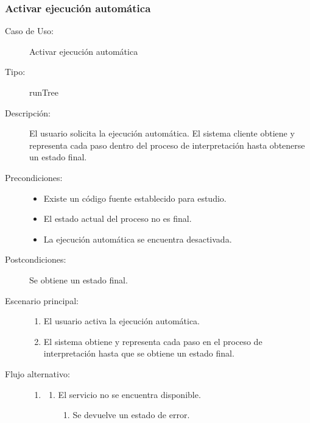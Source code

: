 \subsubsection{Activar ejecución automática} 

\begin{description}
   \item[Caso de Uso:] Activar ejecución automática
   \item [Tipo:] runTree
   \item[Descripción:] 
   El usuario solicita la ejecución automática. 
   El sistema cliente obtiene y representa cada paso dentro del proceso 
   de interpretación hasta obtenerse un estado final.
   \item[Precondiciones:] \hfill 
   \begin{itemize}
   \item Existe un código fuente establecido para estudio. 
   \item El estado actual del proceso no es final.
   \item La ejecución automática se encuentra desactivada. 
   \end{itemize}
   \item[Postcondiciones:] 
   Se obtiene un estado final.
   \item[Escenario principal:] \hfill
   \begin{enumerate}
   \item El usuario activa la ejecución automática.
   \item El sistema obtiene y representa cada paso en el proceso de interpretación hasta que se 
   obtiene un estado final.
   \end{enumerate}
   \item[Flujo alternativo:] \hfill 
   \begin{enumerate} \itemsep1pt \parskip0pt 
   \setcounter{enumi}{1}
   \renewcommand{\labelenumi}{}
   \renewcommand{\labelenumiii}{\arabic{enumiii}.}
   \renewcommand{\labelenumii}{\arabic{enumi}\alph{enumii}.}
      \item 
      \begin {enumerate}
         \setcounter{enumii}{0}
         \item El servicio no se encuentra disponible.
         \begin{enumerate}
         \item Se devuelve un estado de error.
         \end{enumerate}
      \end{enumerate}
   \end{enumerate}
\end{description}


